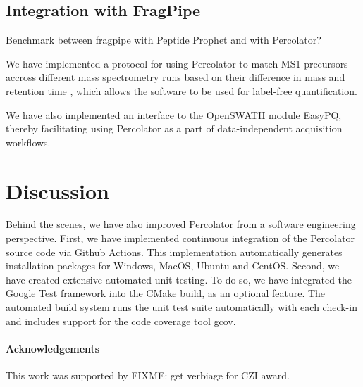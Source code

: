 \documentclass{article}
\newcommand{\fixme}[1]{\color{red}FIXME: #1\color{black}}
\begin{document}
\subsection{Integration with FragPipe}

Benchmark between fragpipe with Peptide Prophet and with Percolator?

We have implemented a protocol for using Percolator to match MS1 precursors accross different mass spectrometry runs based on their difference in mass and retention time \cite{the:focus}, which allows the software to be used for label-free quantification.

We have also implemented an interface to the OpenSWATH module EasyPQ, thereby facilitating using Percolator as a part of data-independent acquisition
workflows.

\section{Discussion}

Behind the scenes, we have also improved Percolator from a software engineering perspective.
First, we have implemented continuous integration of the Percolator source code via Github Actions.
This implementation automatically generates installation packages for Windows, MacOS, Ubuntu and CentOS.
Second, we have created extensive automated unit testing.
To do so, we have integrated the Google Test framework into the CMake build, as an optional feature.
The automated build system runs the unit test suite automatically with each check-in and includes support for the code coverage tool gcov.

\paragraph{Acknowledgements}

This work was supported by \fixme{get verbiage for CZI award.}



\end{document}
